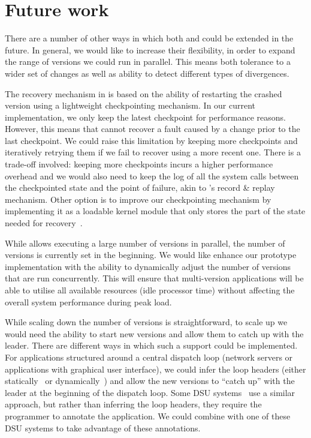 \section{Future work}
\label{sec:future-work}

There are a number of other ways in which both \mx and \varan could be extended
in the future. In general, we would like to increase their flexibility, in
order to expand the range of versions we could run in parallel. This means both
tolerance to a wider set of changes as well as ability to detect different types
of divergences.

The recovery mechanism in \mx is based on the ability of restarting the crashed
version using a lightweight checkpointing mechanism. In our current
implementation, we only keep the latest checkpoint for performance reasons.
However, this means that \mx cannot recover a fault caused by a change prior to
the last checkpoint. We could raise this limitation by keeping more checkpoints
and iteratively retrying them if we fail to recover using a more recent one.
There is a trade-off involved: keeping more checkpoints incurs a higher
performance overhead and we would also need to keep the log of all the system
calls between the checkpointed state and the point of failure, akin to \varan's
record \& replay mechanism. Other option is to improve our checkpointing
mechanism by implementing it as a loadable kernel module that only stores the
part of the state needed for recovery~\cite{flashback}.


While \varan allows executing a large number of versions in parallel, the
number of versions is currently set in the beginning. We would like enhance our
prototype implementation with the ability to dynamically adjust the number of
versions that are run concurrently. This will ensure that multi-version
applications will be able to utilise all available resources (\ie idle
processor time) without affecting the overall system performance during peak
load.

While scaling down the number of versions is straightforward, to scale up we
would need the ability to start new versions and allow them to catch up with the
leader. There are different ways in which such a support could be implemented. For
applications structured around a central dispatch loop (\eg network servers or
applications with graphical user interface), we could infer the loop headers
(either statically~\cite{DJgraphs,havlak} or dynamically~\cite{sato11}) and
allow the new versions to ``catch up'' with the leader at the beginning of the
dispatch loop. Some DSU systems~\cite{kitsune} use a similar approach, but
rather than inferring the loop headers, they require the programmer to annotate
the application. We could combine \varan with one of these DSU systems to take
advantage of these annotations.


